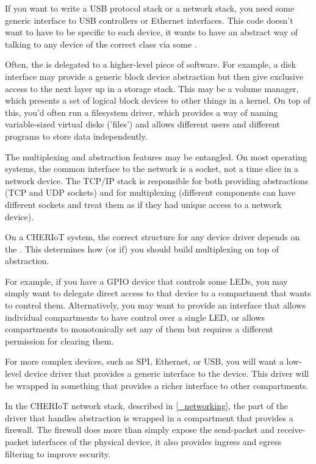 If you want to write a USB protocol stack or a network stack, you need some generic interface to USB controllers or Ethernet interfaces.
This code doesn't want to have to be specific to each device, it wants to have an abstract way of talking to any device of the correct class via some .

Often, the  is delegated to a higher-level piece of software.
For example, a disk interface may provide a generic block device abstraction but then give exclusive access to the next layer up in a storage stack.
This may be a volume manager, which presents a set of logical block devices to other things in a kernel.
On top of this, you'd often run a filesystem driver, which provides a way of naming variable-sized virtual disks ('files') and allows different users and different programs to store data independently.

The multiplexing and abstraction features may be entangled.
On most operating systems, the common interface to the network is a socket, not a time slice in a network device.
The TCP/IP stack is responsible for both providing abstractions (TCP and UDP sockets) and for multiplexing (different components can have different sockets and treat them as if they had unique access to a network device).

On a CHERIoT system, the correct structure for any device driver depends on the .
This determines how (or if) you should build multiplexing on top of abstraction.

For example, if you have a GPIO device that controls some LEDs, you may simply want to delegate direct access to that device to a compartment that wants to control them.
Alternatively, you may want to provide an interface that allows individual compartments to have control over a single LED, or allows compartments to monotonically set any of them but requires a different permission for clearing them.

For more complex devices, such as SPI, Ethernet, or USB, you will want a low-level device driver that provides a generic interface to the device.
This driver will be wrapped in something that provides a richer interface to other compartments.

In the CHERIoT network stack, described in \ref{_networking}, the part of the driver that handles abstraction is wrapped in a compartment that provides a firewall.
The firewall does more than simply expose the send-packet and receive-packet interfaces of the physical device, it also provides ingress and egress filtering to improve security.

